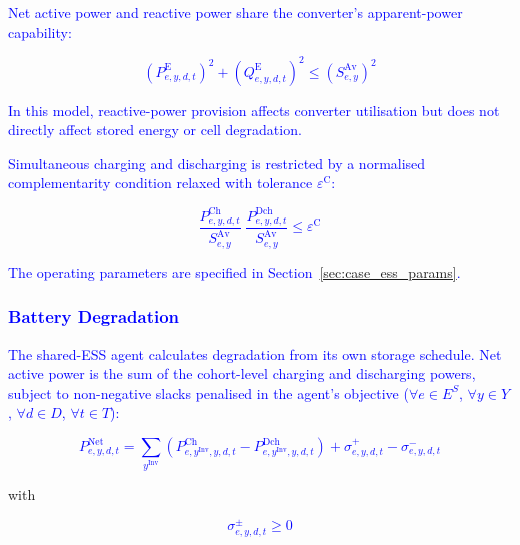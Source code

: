 \documentclass[preprint,12pt]{elsarticle}
\begin{document}
\textcolor{blue}{
    Net active power and reactive power share the converter's apparent-power capability:
}

\textcolor{blue}{
    \begin{equation}
        \left(P^{\text{E}}_{e,y,d,t}\right)^2
        + \left(Q^{\text{E}}_{e,y,d,t}\right)^2
        \le \left(S^{\text{Av}}_{e,y}\right)^2
        \label{eq:converter_capability}
    \end{equation}
}

\textcolor{blue}{
    In this model, reactive-power provision affects converter utilisation but does not directly affect stored energy or cell degradation.
}

\textcolor{blue}{Simultaneous charging and discharging is restricted by a normalised complementarity condition relaxed with tolerance $\varepsilon^{\text{C}}$:}

\textcolor{blue}{
    \begin{equation}
        \frac{P^{\text{Ch}}_{e,y,d,t}}{S^{\text{Av}}_{e,y}} \; \frac{P^{\text{Dch}}_{e,y,d,t}}{S^{\text{Av}}_{e,y}} \le \varepsilon^{\text{C}}
        \label{eq:network_complementarity}
    \end{equation}
}

\textcolor{blue}{
    The operating parameters are specified in Section~\ref{sec:case_ess_params}.
}

\subsubsection{\textcolor{blue}{Battery Degradation}}

\textcolor{blue}{
    The shared-ESS agent calculates degradation from its own storage schedule. Net active power is the sum of the cohort-level charging and discharging powers, subject to non-negative slacks penalised in the agent's objective ($\forall e\in E^S$, $\forall y\in Y$, $\forall d\in D$, $\forall t\in T$):
}

\textcolor{blue}{
    \begin{equation}
        P^{\text{Net}}_{e,y,d,t} = \sum_{y^\text{Inv}} \left( P^{\text{Ch}}_{e,y^\text{Inv},y,d,t} - P^{\text{Dch}}_{e,y^\text{Inv},y,d,t} \right)
        + \sigma^{+}_{e,y,d,t} - \sigma^{-}_{e,y,d,t}
        \label{eq:esso_net_power}
    \end{equation}
}

\noindent
with

\textcolor{blue}{
    \begin{equation}
        \sigma^{\pm}_{e,y,d,t} \ge 0
    \end{equation}    
}
\end{document}
